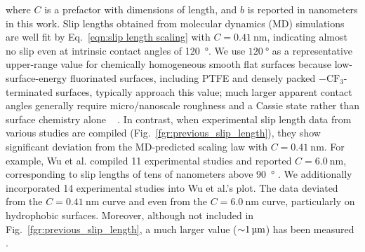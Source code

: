 \documentclass[journal=jacsat,manuscript=article]{achemso}
\providecommand{\DIFadd}[1]{{\protect\color{blue}#1}} %
\providecommand{\DIFdel}[1]{} %
\providecommand{\DIFaddbegin}{} %
\providecommand{\DIFaddend}{} %
\providecommand{\DIFdelbegin}{} %
\providecommand{\DIFdelend}{} %
\newcommand{\DIFaddincludegraphics}[2][]{{\color{blue}\DIFOincludegraphics[#1]{#2}}} %
\newcommand{\DIFdelincludegraphics}[2][]{} %
\DeclareRobustCommand{\DIFaddbegin}{\DIFOaddbegin \let\includegraphics\DIFaddincludegraphics} %
\DeclareRobustCommand{\DIFaddend}{\DIFOaddend \let\includegraphics\DIFOincludegraphics} %
\DeclareRobustCommand{\DIFdelbegin}{\DIFOdelbegin \let\includegraphics\DIFdelincludegraphics} %
\DeclareRobustCommand{\DIFdelend}{\DIFOaddend \let\includegraphics\DIFOincludegraphics} %
\begin{document}
where \(C\) is a \DIFdelbegin \DIFdel{proportionality constant}\DIFdelend \DIFaddbegin \DIFadd{prefactor with dimensions of length, and \(b\) is reported in nanometers in this work}\DIFaddend . Slip lengths obtained from molecular dynamics (MD) simulations are well fit by Eq.~\ref{eqn:slip length scaling} with \DIFdelbegin \DIFdel{\(C = 0.41\)}\DIFdelend \DIFaddbegin \DIFadd{\(C = \SI{0.41}{\nano\metre}\)}\DIFaddend , indicating almost no slip even at intrinsic contact angles of \SI{120}{\degree}\DIFdelbegin \DIFdel{, which is the near-maximum achievable on a topographically smooth flat surface \mbox{%
\cite{Nishino1999-dk}}\hskip0pt%
}\DIFdelend \DIFaddbegin \DIFadd{. We use \(\SI{120}{\degree}\) as a representative upper-range value for chemically homogeneous smooth flat surfaces because low-surface-energy fluorinated surfaces, including PTFE and densely packed \(-\mathrm{CF}_3\)-terminated surfaces, typically approach this value; much larger apparent contact angles generally require micro/nanoscale roughness and a Cassie state rather than surface chemistry alone \mbox{%
\cite{Nishino1999-dk, Quere2008-lq, Verho2011-as}}\hskip0pt%
}\DIFaddend . In contrast, when experimental slip length data from various studies are compiled (Fig.~\ref{fgr:previous_slip_length}), they show significant deviation from the MD-predicted scaling law with \DIFdelbegin \DIFdel{\(C = 0.41\)}\DIFdelend \DIFaddbegin \DIFadd{\(C = \SI{0.41}{\nano\metre}\)}\DIFaddend . For example, Wu et al. compiled 11 experimental studies and reported \DIFdelbegin \DIFdel{$C=6.0$}\DIFdelend \DIFaddbegin \DIFadd{\(C = \SI{6.0}{\nano\metre}\)}\DIFaddend , corresponding to slip lengths of tens of nanometers above \SI{90}{\degree} \cite{Wu2016-vv}. We additionally incorporated 14 experimental studies into Wu et al.'s plot. The data deviated from the \DIFdelbegin \DIFdel{$C=0.41$ }\DIFdelend \DIFaddbegin \DIFadd{\(C = \SI{0.41}{\nano\metre}\) }\DIFaddend curve and even from the \DIFdelbegin \DIFdel{$C=6.0$ }\DIFdelend \DIFaddbegin \DIFadd{\(C = \SI{6.0}{\nano\metre}\) }\DIFaddend curve, particularly on hydrophobic surfaces. Moreover, although not included in Fig.~\ref{fgr:previous_slip_length}, a much larger value ($\SI{\sim1}{\micro\metre}$) has been measured \cite{Tretheway2002-et}.
\end{document}

